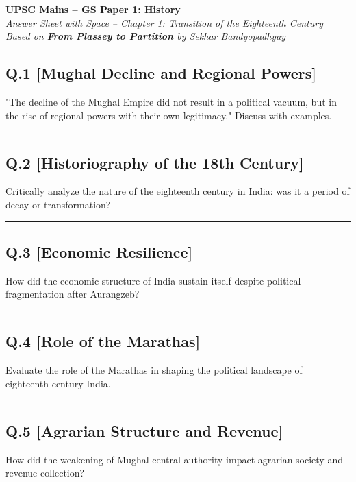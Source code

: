 \documentclass[14pt,a4paper]{extarticle}
\newcommand{\answerspace}[1]{%
    \vspace{#1}
    \noindent\rule{\linewidth}{0.4pt}
}
\begin{document}
\begin{center}
    \Large\textbf{UPSC Mains – GS Paper 1: History}\\
    \normalsize\textit{Answer Sheet with Space – Chapter 1: Transition of the Eighteenth Century}\\
    \vspace{0.5em}
    \textit{Based on \textbf{From Plassey to Partition} by Sekhar Bandyopadhyay}
\end{center}

\vspace{1em}

\subsection*{Q.1 [Mughal Decline and Regional Powers]}
"The decline of the Mughal Empire did not result in a political vacuum, but in the rise of regional powers with their own legitimacy." Discuss with examples.

\answerspace{6cm}

\subsection*{Q.2 [Historiography of the 18th Century]}
Critically analyze the nature of the eighteenth century in India: was it a period of decay or transformation?

\answerspace{6cm}

\subsection*{Q.3 [Economic Resilience]}
How did the economic structure of India sustain itself despite political fragmentation after Aurangzeb?

\answerspace{5cm}

\subsection*{Q.4 [Role of the Marathas]}
Evaluate the role of the Marathas in shaping the political landscape of eighteenth-century India.

\answerspace{5cm}

\subsection*{Q.5 [Agrarian Structure and Revenue]}
How did the weakening of Mughal central authority impact agrarian society and revenue collection?
\end{document}
